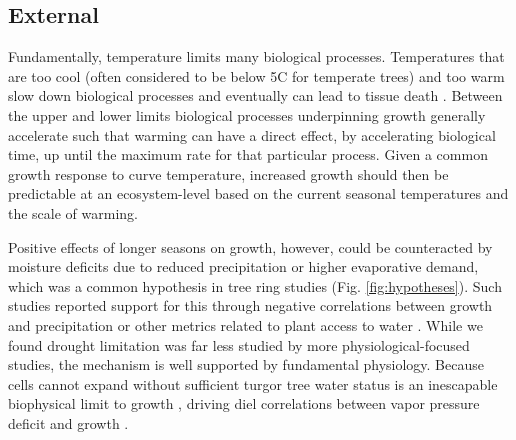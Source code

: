 \documentclass[11pt]{article}
\begin{document}
\subsection*{External}

Fundamentally, temperature limits many biological processes. Temperatures that are too cool (often considered to be below 5\degree C for temperate trees) and too warm \citep[an area of active research,][]{martinez2008hot,cabon2022cross} slow down biological processes and eventually can lead to tissue death \citep[see Fig. \ref{fig:temperaturecomplex},][]{larcher1980,kramer2012book}. Between the upper and lower limits biological processes underpinning growth generally accelerate such that warming can have a direct effect,  by accelerating biological time, up until the maximum rate for that particular process. Given a common growth response to curve temperature, increased growth should then be predictable at an ecosystem-level based on the current seasonal temperatures and the scale of warming. 

Positive effects of longer seasons on growth, however, could be counteracted by moisture deficits due to reduced precipitation or higher evaporative demand, which was a common hypothesis in tree ring studies (Fig. \ref{fig:hypotheses}). Such studies reported support for this through negative correlations between growth and precipitation or other metrics related to plant access to water \citep{george2014overview,babst2019twentieth}. While we found drought limitation was far less studied by more physiological-focused studies, the mechanism is well supported by fundamental physiology. Because cells cannot expand without sufficient turgor \citep{cosgrove1987wall,cosgrove2023structure} tree water status is an inescapable biophysical limit to growth \citep{peters2021turgor}, driving diel correlations between vapor pressure deficit and growth \citep{babst2019twentieth,zweifel2021trees}.
\end{document}

